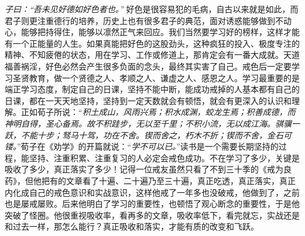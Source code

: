 \textit{子曰：“吾未见好德如好色者也。”} 好色是很容易犯的毛病，自古以来就是如此，而君子则更注重德行的培养，历史上也有很多君子的典范，面对诱惑能够做到不动心，能够把持得住，能够以凛然正气来回应。我们当然要学习好的榜样，这样才能有一个正能量的人生。如果真能把好色的这股劲头，这种疯狂的投入、极度专注的精神、不知疲倦的状态，用在学习、工作或修道上，那肯定会有一番大成就。天道福善祸淫，好色必然会产生很多负面的念头，最终其实害了自己。戒色后一定要学习圣贤教育，做一个贤德之人、孝顺之人、谦虚之人、感恩之人。学习最重要的是端正学习态度，制定自己的日课，坚持不能中断，能成功戒掉的人基本都有自己的日课，都在一天天地坚持，坚持到一定天数就会有顿悟，就会有更深入的认识和理解。正如荀子所说：“\textit{积土成山，风雨兴焉；积水成渊，蛟龙生焉；积善成德，而神明自得，圣心备焉。故不积跬步，无以至千里；不积小流，无以成江海。骐骥一跃，不能十步；驽马十驾，功在不舍。锲而舍之，朽木不折；锲而不舍，金石可镂。}”荀子在《劝学》的开篇就说：“\textit{学不可以已。}”读书是一个需要长期坚持的过程，能坚持、注重积累、注重复习的人必定会戒色成功。不在学习了多少，关键是吸收了多少，真正落实了多少！记得一位戒友虽然只看了不到三十季的《戒为良药》，但他把有的文章看了十遍、二十遍乃至三十遍，真正吃透，真正落实，真正内化成自己的戒色意识和实战意识，这样他戒了一年多也没破戒，他做到了，之前也是屡戒屡败。后来他明白了学习的重要性，也顿悟了观心断念的重要性，于是他突破了怪圈。他很重视吸收率，看再多的文章，吸收率低下，看完就忘，实战还是和过去一样，那怎么能行？真正吸收和落实，才能有质的改变和飞跃。

